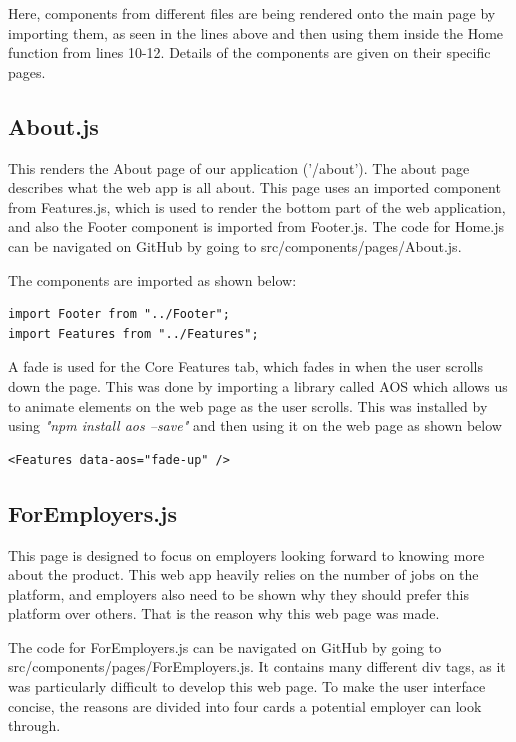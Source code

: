 Here, components from different files are being rendered onto the main page by importing them, as seen in the lines above and then using them inside the Home function from lines 10-12. Details of the components are given on their specific pages.

\subsection{About.js}
This renders the About page of our application ('/about'). The about page describes what the web app is all about. This page uses an imported component from Features.js, which is used to render the bottom part of the web application, and also the Footer component is imported from Footer.js. The code for Home.js can be navigated on GitHub by going to src/components/pages/About.js.

The components are imported as shown below:
\begin{lstlisting}
import Footer from "../Footer";
import Features from "../Features";
\end{lstlisting}

A fade is used for the Core Features tab, which fades in when the user scrolls down the page. This was done by importing a library called AOS which allows us to animate elements on the web page as the user scrolls. This was installed by using \textit{"npm install aos --save"} and then using it on the web page as shown below

\begin{lstlisting}
<Features data-aos="fade-up" />
\end{lstlisting}

\subsection{ForEmployers.js}
This page is designed to focus on employers looking forward to knowing more about the product. This web app heavily relies on the number of jobs on the platform, and employers also need to be shown why they should prefer this platform over others. That is the reason why this web page was made. 

The code for ForEmployers.js can be navigated on GitHub by going to src/components/pages/ForEmployers.js. It contains many different div tags, as it was particularly difficult to develop this web page. To make the user interface concise, the reasons are divided into four cards a potential employer can look through. 

